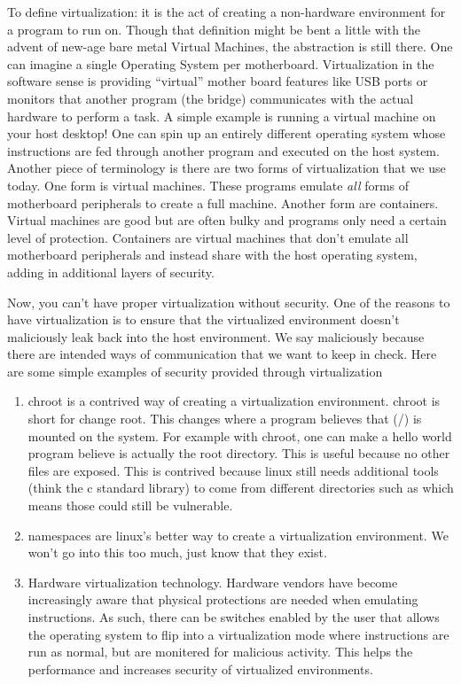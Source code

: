 To define virtualization: it is the act of creating a non-hardware environment for a program to run on.
Though that definition might be bent a little with the advent of new-age bare metal Virtual Machines, the abstraction is still there.
One can imagine a single Operating System per motherboard.
Virtualization in the software sense is providing ``virtual'' mother board features like USB ports or monitors that another program (the bridge) communicates with the actual hardware to perform a task.
A simple example is running a virtual machine on your host desktop!
One can spin up an entirely different operating system whose instructions are fed through another program and executed on the host system.
Another piece of terminology is there are two forms of virtualization that we use today.
One form is virtual machines.
These programs emulate \textit{all} forms of motherboard peripherals to create a full machine.
Another form are containers.
Virtual machines are good but are often bulky and programs only need a certain level of protection.
Containers are virtual machines that don't emulate all motherboard peripherals and instead share with the host operating system, adding in additional layers of security.

Now, you can't have proper virtualization without security.
One of the reasons to have virtualization is to ensure that the virtualized environment doesn't maliciously leak back into the host environment.
We say maliciously because there are intended ways of communication that we want to keep in check.
Here are some simple examples of security provided through virtualization

\begin{enumerate}
\item chroot is a contrived way of creating a virtualization environment. chroot is short for change root. This changes where a program believes that (/) is mounted on the system. For example with chroot, one can make a hello world program believe  is actually the root directory. This is useful because no other files are exposed. This is contrived because linux still needs additional tools (think the c standard library) to come from different directories such as  which means those could still be vulnerable.
\item namespaces are linux's better way to create a virtualization environment. We won't go into this too much, just know that they exist.
\item Hardware virtualization technology. Hardware vendors have become increasingly aware that physical protections are needed when emulating instructions. As such, there can be switches enabled by the user that allows the operating system to flip into a virtualization mode where instructions are run as normal, but are monitered for malicious activity. This helps the performance and increases security of virtualized environments.
\end{enumerate}

